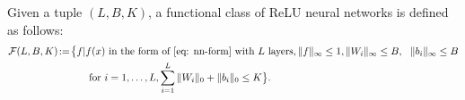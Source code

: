 \begin{definition}\label{defi: nn-class}
    Given a tuple $(L,B,K)$, a functional class of ReLU neural networks is defined as follows:
    \begin{align*}
        \mathcal{F}(L,B,K)\! :=\!\big\{ f |& f(x) \text{ in the form of } \eqref{eq: nn-form} \text{ with } L \text{ layers}, \|f\|_\infty \leq 1, 
        \|W_i\|_\infty \leq B, ~~\|b_i\|_\infty \leq B\\
        &\text{ for } i=1,\ldots,L, \sum_{i=1}^L \|W_i\|_0 + \|b_i\|_0 \leq K \big\}.
    \end{align*}
\end{definition}
